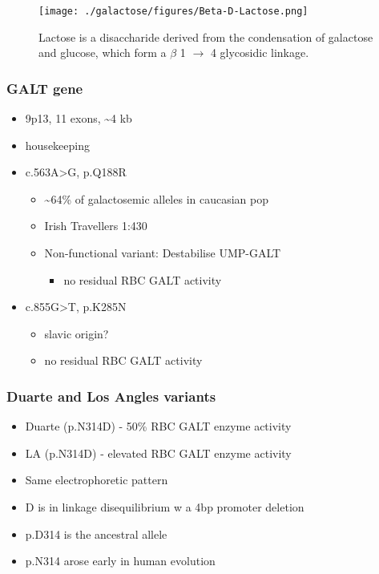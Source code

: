 \documentclass{scrartcl}
\begin{document}
\begin{figure}[htbp]
\centering
\texttt{[image: ./galactose/figures/Beta-D-Lactose.png]}
\caption[lactose]{\label{fig:orge402926}
Lactose is a disaccharide derived from the condensation of galactose and glucose, which form a \(\beta\) 1 \(\to\) 4 glycosidic linkage.}
\end{figure}

\subsubsection{GALT gene}
\label{sec:orgd61d4e8}
\begin{itemize}
\item 9p13, 11 exons, \textasciitilde{}4 kb
\item housekeeping
\item c.563A>G, p.Q188R
\begin{itemize}
\item \textasciitilde{}64\% of galactosemic alleles in caucasian pop
\item Irish Travellers 1:430
\item Non-functional variant: Destabilise UMP-GALT
\begin{itemize}
\item no residual RBC GALT activity
\end{itemize}
\end{itemize}
\item c.855G>T, p.K285N
\begin{itemize}
\item slavic origin?
\item no residual RBC GALT activity
\end{itemize}
\end{itemize}

\subsubsection{Duarte and Los Angles variants}
\label{sec:org937bde4}
\begin{itemize}
\item Duarte (p.N314D) - 50\% RBC GALT enzyme activity
\item LA (p.N314D) - elevated RBC GALT enzyme activity
\item Same electrophoretic pattern
\item D is in linkage disequilibrium w a 4bp promoter deletion
\item p.D314 is the ancestral allele
\item p.N314 arose early in human evolution
\end{itemize}
\end{document}

